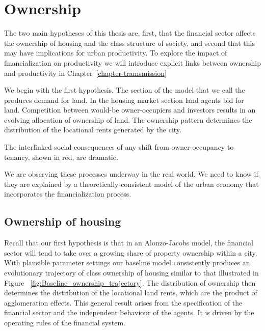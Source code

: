 
\chapter{Ownership} \label{chapter-ownership}




The two main hypotheses of this thesis are, first, that the financial sector affects the ownership of housing and the class structure of society, and second that this may have implications for urban productivity. To explore the impact of financialization on productivity we will introduce explicit links between ownership and productivity in Chapter~\ref{chapter-tramsmission}

We begin with the first hypothesis. The section of the model that we call the produces demand for land. In the housing market section land agents bid for land. Competition between would-be owner-occupiers and investors results in an evolving allocation of ownership of land. The ownership pattern determines the distribution of the locational rents generated by the city.



The interlinked social consequences of any shift from owner-occupancy to tenancy, shown in red, are dramatic. 


We are observing these processes underway in the real world. We need to know if they are explained by a theoretically-consistent model of the urban economy that incorporates the financialization process.

\section{Ownership of housing}

Recall that our first hypothesis is that in an \Gls{Alonzo-Jacobs model}, the financial sector will tend to take over a growing share of property ownership within a city. 
With  plausible parameter settings our baseline model consistently produces an evolutionary trajectory of class ownership of housing similar to that illustrated in Figure ~\ref{fig:Baseline_ownership_trajectory}. The distribution of ownership then determines the distribution of the locational land rents, which are the product of agglomeration effects. This general result arises from the specification of the financial sector and the independent behaviour of the agents. It is driven by the operating rules of the financial system. 

